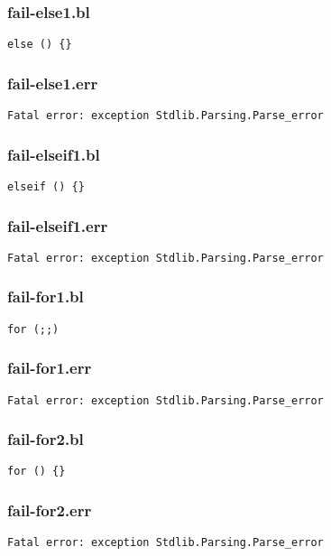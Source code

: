 \subsubsection{fail-else1.bl}
\begin{lstlisting}
else () {}\end{lstlisting}
\subsubsection{fail-else1.err}
\begin{lstlisting}
Fatal error: exception Stdlib.Parsing.Parse_error
\end{lstlisting}
\subsubsection{fail-elseif1.bl}
\begin{lstlisting}
elseif () {}\end{lstlisting}
\subsubsection{fail-elseif1.err}
\begin{lstlisting}
Fatal error: exception Stdlib.Parsing.Parse_error
\end{lstlisting}
\subsubsection{fail-for1.bl}
\begin{lstlisting}
for (;;)\end{lstlisting}
\subsubsection{fail-for1.err}
\begin{lstlisting}
Fatal error: exception Stdlib.Parsing.Parse_error
\end{lstlisting}
\subsubsection{fail-for2.bl}
\begin{lstlisting}
for () {}\end{lstlisting}
\subsubsection{fail-for2.err}
\begin{lstlisting}
Fatal error: exception Stdlib.Parsing.Parse_error
\end{lstlisting}
